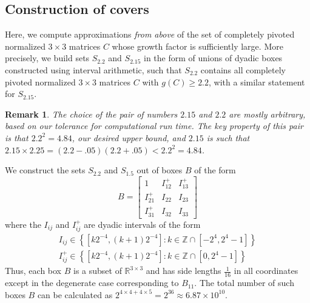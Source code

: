 \documentclass[reqno]{amsart}
\numberwithin{equation}{section}
\newcommand\R{\mathbb{R}}
\newcommand\Z{\mathbb{Z}}
\newcommand{\set}[1]{\left\{#1\right\}}
\newtheorem{remark}[theorem]{Remark}
\begin{document}
\subsection{Construction of covers}\label{sub:cover}
Here, we compute approximations \textit{from above} of the set of  completely pivoted normalized $3 \times 3$ matrices $C$ whose growth factor is sufficiently large. More precisely, we build sets $S_{2.2}$ and $S_{2.15}$ in the form of unions of dyadic boxes constructed using interval arithmetic, such that $S_{2.2}$ contains all  completely pivoted normalized $3 \times 3$ matrices $C$ with $g(C) \geq 2.2$, with a similar statement for $S_{2.15}$.

\begin{remark}
The choice of the pair of numbers $2.15$ and $2.2$ are mostly arbitrary, based on our tolerance for computational run time. The key property of this pair is that $2.2^2 = 4.84$, our desired upper bound, and $2.15$ is such that $2.15 \times 2.25 = (2.2 - .05)(2.2 + .05) < 2.2^2 = 4.84$.
\end{remark}

    We construct the sets $S_{2.2}$ and $S_{1.5}$ out of boxes $B$ of the form 
    \begin{equation}
        B = \begin{bmatrix}
            1 & I_{12}^+ & I_{13}^+ \\
            I_{21}^+ & I_{22} & I_{23} \\
            I_{31}^+ & I_{32} & I_{33}
        \end{bmatrix}
    \end{equation}
    where the $I_{ij}$ and $I_{ij}^+$ are dyadic intervals of the form 
    \begin{align}
        I_{ij} \in  \set{[k2^{-4},(k+1)2^{-4}]:k\in\Z\cap[-2^4,2^4-1]} \\ 
        I_{ij}^+ \in  \set{[k2^{-4},(k+1)2^{-4}]:k\in\Z\cap[0,2^4-1]}
    \end{align}
    Thus, each box $B$ is a subset of $\R^{3 \times 3}$ and has side lengths $\frac{1}{16}$ in all coordinates except in the degenerate case corresponding to $B_{11}$. The total number of such boxes $B$ can be calculated as $2^{4 \times 4 + 4 \times 5} = 2^{36} \approx 6.87 \times 10^{10}$.
\end{document}
